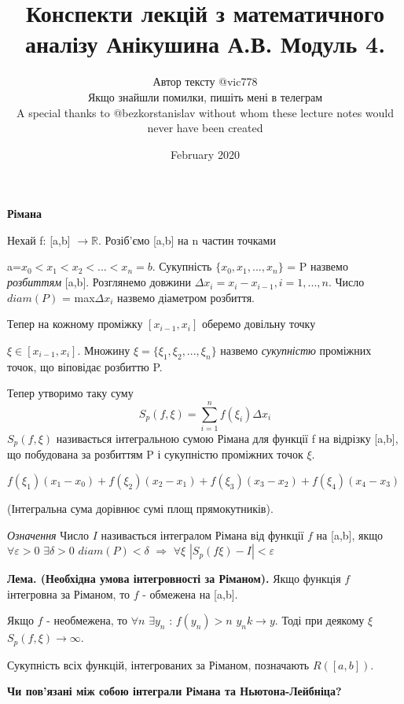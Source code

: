 \documentclass[12pt]{report}
\title{Конспекти лекцій з математичного аналізу Анікушина А.В. Модуль 4.}
\author{Автор тексту @vic778 \\ Якщо знайшли помилки, пишіть мені в телеграм \\  \small{A special thanks to @bezkorstanislav without whom these lecture notes would never have been created}}
\date{February 2020}
\begin{document}
	\maketitle

\begin{center}
	\textbf{ Рімана} 
\end{center}
 
 Нехай f: [a,b]	$\rightarrow \mathbb{R}$. Розіб'ємо [a,b] на n частин точками 
 
 a=$x_0<x_1<x_2<...<x_n=b$. Сукупність  $\{x_0, x_1, ..., x_n\}$ = P назвемо \textit{ розбиттям} [a,b]. Розглянемо довжини $\Delta x_i = x_i - x_{i-1},     i = 1, ..., n.$
Число $\textit{diam} (P)$ = max$ \Delta x_i$ назвемо $\textit{діаметром}$ розбиття.

Тепер на кожному проміжку $[x_{i-1}, x_i]$ оберемо довільну точку  

$\xi \in [x_{i-1}, x_i]$. Множину $\xi = \{\xi_1, \xi_2, ..., \xi_n\}$ назвемо  \textit{сукупністю} проміжних точок, що віповідає розбиттю P. 

Тепер утворимо таку суму \[  S_p (f, \xi)  = \sum\limits_{i=1}^n f(\xi_i)\Delta x_i \]
$ S_p (f, \xi)   $ називається інтегральною сумою Рімана для функції f на відрізку [a,b], що побудована за розбиттям P і сукупністю проміжних точок $ \xi $.

$ f(\xi_1)(x_1 - x_0)+ f(\xi_2)(x_2 - x_1)+ f(\xi_3)(x_3 - x_2) +f(\xi_4)(x_4- x_3) $ 

(Інтегральна сума дорівнює сумі площ прямокутників).

\textit{Означення} Число $I$ називається $\textit{інтегралом Рімана} $ від функції  $ f $
на [a,b], якщо $ \forall \varepsilon > 0 $   $ \exists \delta > 0$   $ diam (P) < \delta$ $\Rightarrow  $ $ \forall \xi $ $ |S_p(f\xi) - I|  < \varepsilon$

\vspace{5 mm} 

\textbf{Лема. (Необхідна умова інтегровності за Ріманом).} Якщо функція $ f $ інтегровна за Ріманом, то $ f $ - обмежена на [a,b].

Якщо $ f $ - необмежена, то $ \forall n $  $ \exists y_n $ : $ f(y_n) > n$ $ y_nk \rightarrow y $. Тоді при деякому $ \xi $ $ S_p (f, \xi)  \rightarrow \infty$.

\vspace{5 mm} 
Сукупність всіх функцій, інтегрованих за Ріманом, позначають $ R([a,b]) $.

\begin{center}
	\textbf{\Large Чи пов'язані між собою інтеграли Рімана та Ньютона-Лейбніца?} 
\end{center}
\end{document}
